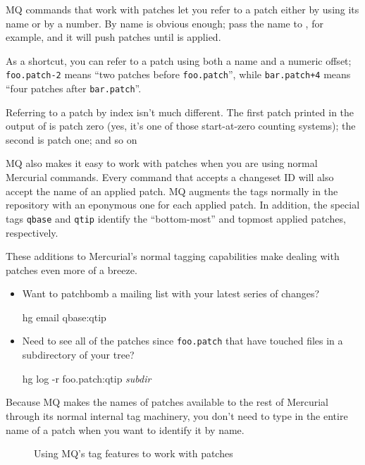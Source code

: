 MQ commands that work with patches let you refer to a patch either by
using its name or by a number.  By name is obvious enough; pass the
name  to , for example, and it will
push patches until  is applied.  

As a shortcut, you can refer to a patch using both a name and a
numeric offset; \texttt{foo.patch-2} means ``two patches before
\texttt{foo.patch}'', while \texttt{bar.patch+4} means ``four patches
after \texttt{bar.patch}''.

Referring to a patch by index isn't much different.  The first patch
printed in the output of  is patch zero (yes, it's one
of those start-at-zero counting systems); the second is patch one; and
so on

MQ also makes it easy to work with patches when you are using normal
Mercurial commands.  Every command that accepts a changeset ID will
also accept the name of an applied patch.  MQ augments the tags
normally in the repository with an eponymous one for each applied
patch.  In addition, the special tags \texttt{qbase} and \texttt{qtip} identify the ``bottom-most'' and
topmost applied patches, respectively.

These additions to Mercurial's normal tagging capabilities make
dealing with patches even more of a breeze.
\begin{itemize}
\item Want to patchbomb a mailing list with your latest series of
  changes?
  \begin{codesample4}
    hg email qbase:qtip
  \end{codesample4}
\item Need to see all of the patches since \texttt{foo.patch} that
  have touched files in a subdirectory of your tree?
  \begin{codesample4}
    hg log -r foo.patch:qtip \emph{subdir}
  \end{codesample4}
\end{itemize}

Because MQ makes the names of patches available to the rest of
Mercurial through its normal internal tag machinery, you don't need to
type in the entire name of a patch when you want to identify it by
name.

\begin{figure}[ht]
  \caption{Using MQ's tag features to work with patches}
  \label{ex:mq:id}
\end{figure}

